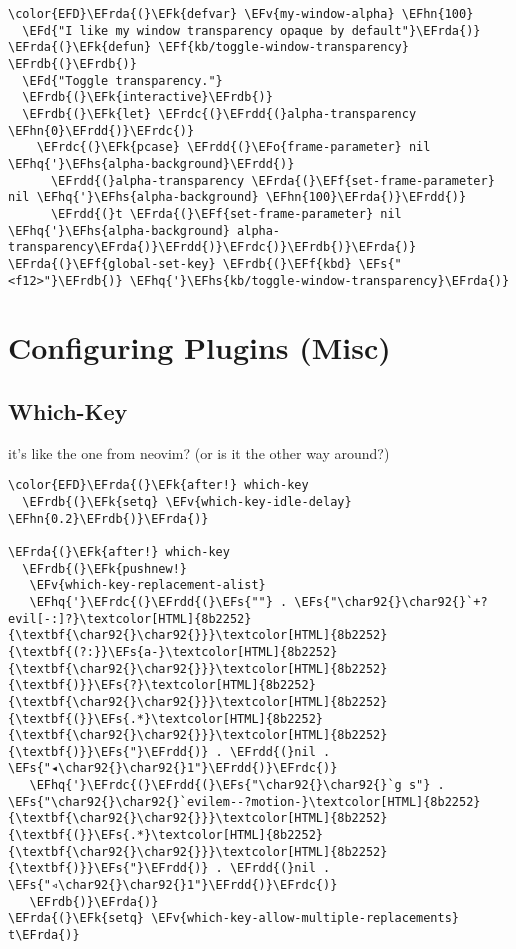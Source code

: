 \documentclass{article}
\newcommand{\EFs}[1]{\textcolor{EFs}{#1}} %
\newcommand{\EFd}[1]{\textcolor{EFd}{#1}} %
\newcommand{\EFk}[1]{\textcolor{EFk}{#1}} %
\newcommand{\EFf}[1]{\textcolor{EFf}{#1}} %
\newcommand{\EFv}[1]{\textcolor{EFv}{#1}} %
\newcommand{\EFo}[1]{\textcolor{EFo}{#1}} %
\newcommand{\EFhn}[1]{\textcolor{EFhn}{\textbf{#1}}} %
\newcommand{\EFhq}[1]{#1} %
\newcommand{\EFhs}[1]{\textcolor{EFhs}{#1}} %
\newcommand{\EFrda}[1]{\textcolor{EFrda}{#1}} %
\newcommand{\EFrdb}[1]{\textcolor{EFrdb}{#1}} %
\newcommand{\EFrdc}[1]{\textcolor{EFrdc}{#1}} %
\newcommand{\EFrdd}[1]{\textcolor{EFrdd}{#1}} %
\begin{document}
\begin{Code}
\begin{Verbatim}
\color{EFD}\EFrda{(}\EFk{defvar} \EFv{my-window-alpha} \EFhn{100}
  \EFd{"I like my window transparency opaque by default"}\EFrda{)}
\EFrda{(}\EFk{defun} \EFf{kb/toggle-window-transparency} \EFrdb{(}\EFrdb{)}
  \EFd{"Toggle transparency."}
  \EFrdb{(}\EFk{interactive}\EFrdb{)}
  \EFrdb{(}\EFk{let} \EFrdc{(}\EFrdd{(}alpha-transparency \EFhn{0}\EFrdd{)}\EFrdc{)}
    \EFrdc{(}\EFk{pcase} \EFrdd{(}\EFo{frame-parameter} nil \EFhq{'}\EFhs{alpha-background}\EFrdd{)}
      \EFrdd{(}alpha-transparency \EFrda{(}\EFf{set-frame-parameter} nil \EFhq{'}\EFhs{alpha-background} \EFhn{100}\EFrda{)}\EFrdd{)}
      \EFrdd{(}t \EFrda{(}\EFf{set-frame-parameter} nil \EFhq{'}\EFhs{alpha-background} alpha-transparency\EFrda{)}\EFrdd{)}\EFrdc{)}\EFrdb{)}\EFrda{)}
\EFrda{(}\EFf{global-set-key} \EFrdb{(}\EFf{kbd} \EFs{"<f12>"}\EFrdb{)} \EFhq{'}\EFhs{kb/toggle-window-transparency}\EFrda{)}
\end{Verbatim}
\end{Code}

\section{Configuring Plugins (Misc)}
\label{sec:org64c1c61}
\subsection{Which-Key}
\label{sec:org5df51b8}
it's like the one from neovim? (or is it the other way around?)
\begin{Code}
\begin{Verbatim}
\color{EFD}\EFrda{(}\EFk{after!} which-key
  \EFrdb{(}\EFk{setq} \EFv{which-key-idle-delay} \EFhn{0.2}\EFrdb{)}\EFrda{)}

\EFrda{(}\EFk{after!} which-key
  \EFrdb{(}\EFk{pushnew!}
   \EFv{which-key-replacement-alist}
   \EFhq{'}\EFrdc{(}\EFrdd{(}\EFs{""} . \EFs{"\char92{}\char92{}`+?evil[-:]?}\textcolor[HTML]{8b2252}{\textbf{\char92{}\char92{}}}\textcolor[HTML]{8b2252}{\textbf{(?:}}\EFs{a-}\textcolor[HTML]{8b2252}{\textbf{\char92{}\char92{}}}\textcolor[HTML]{8b2252}{\textbf{)}}\EFs{?}\textcolor[HTML]{8b2252}{\textbf{\char92{}\char92{}}}\textcolor[HTML]{8b2252}{\textbf{(}}\EFs{.*}\textcolor[HTML]{8b2252}{\textbf{\char92{}\char92{}}}\textcolor[HTML]{8b2252}{\textbf{)}}\EFs{"}\EFrdd{)} . \EFrdd{(}nil . \EFs{"◂\char92{}\char92{}1"}\EFrdd{)}\EFrdc{)}
   \EFhq{'}\EFrdc{(}\EFrdd{(}\EFs{"\char92{}\char92{}`g s"} . \EFs{"\char92{}\char92{}`evilem--?motion-}\textcolor[HTML]{8b2252}{\textbf{\char92{}\char92{}}}\textcolor[HTML]{8b2252}{\textbf{(}}\EFs{.*}\textcolor[HTML]{8b2252}{\textbf{\char92{}\char92{}}}\textcolor[HTML]{8b2252}{\textbf{)}}\EFs{"}\EFrdd{)} . \EFrdd{(}nil . \EFs{"◃\char92{}\char92{}1"}\EFrdd{)}\EFrdc{)}
   \EFrdb{)}\EFrda{)}
\EFrda{(}\EFk{setq} \EFv{which-key-allow-multiple-replacements} t\EFrda{)}
\end{Verbatim}
\end{Code}
\end{document}
